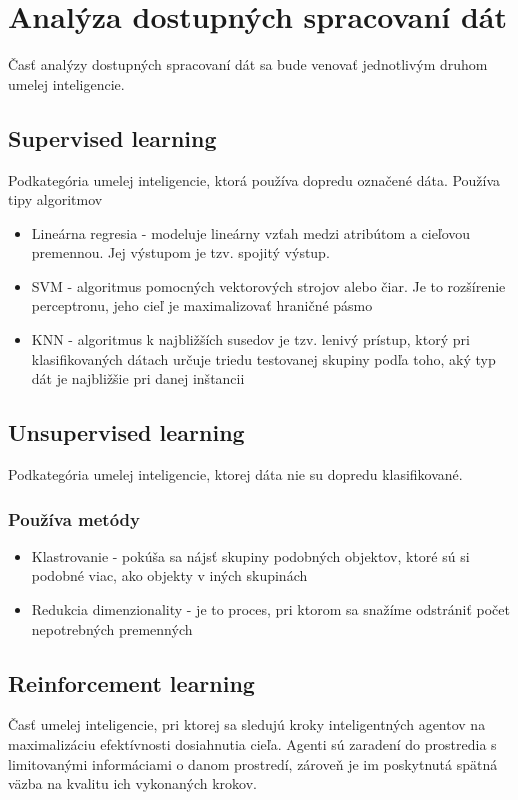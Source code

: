 \section{Analýza dostupných spracovaní dát}
Časť analýzy dostupných spracovaní dát sa bude venovať jednotlivým druhom umelej inteligencie.

\subsection{Supervised learning}
Podkategória umelej inteligencie, ktorá používa dopredu označené dáta.  Používa tipy algoritmov\cite{umelainteligencia}
 \begin{itemize}
	\item Lineárna regresia - modeluje lineárny vzťah medzi atribútom a cieľovou premennou. Jej výstupom je tzv. spojitý výstup.\cite{regresia}
	\item SVM - algoritmus pomocných vektorových strojov alebo čiar. Je to rozšírenie perceptronu, jeho cieľ je maximalizovať hraničné pásmo \cite{svm}
	\item KNN - algoritmus k najbližších susedov je tzv. lenivý prístup, ktorý pri klasifikovaných dátach určuje triedu testovanej skupiny podľa toho, aký typ dát je najbližšie pri danej inštancii\cite{knn}
\end{itemize}

\subsection{Unsupervised learning}
Podkategória umelej inteligencie, ktorej dáta nie su dopredu klasifikované. 
\subsubsection{Používa metódy}
 \begin{itemize}
	\item Klastrovanie - pokúša sa nájsť skupiny podobných objektov, ktoré sú si podobné viac, ako objekty v iných skupinách\cite{clustering}
	\item Redukcia dimenzionality - je to proces, pri ktorom sa snažíme odstrániť počet nepotrebných premenných \cite{dimenzionalita}
\end{itemize}

\subsection{Reinforcement learning}
Časť umelej inteligencie, pri ktorej sa sledujú kroky inteligentných agentov na maximalizáciu efektívnosti dosiahnutia cieľa. Agenti sú zaradení do prostredia s limitovanými informáciami o danom prostredí, zároveň je im poskytnutá spätná väzba na kvalitu ich vykonaných krokov. \cite{reinforcement}
